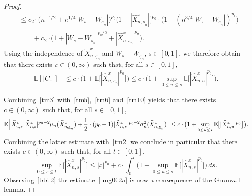 \documentclass[11pt]{amsart}
\newcommand{\EE}{{\mathbb E}}
\newcommand{\usn}{\underline {s}_n}
\theoremstyle{plain}
\theoremstyle{definition}
\begin{document}
\begin{proof}
\begin{equation}
\begin{aligned}
& \le c_2\cdot\bigl(n^{-1/2} + n^{1/4}|W_s-W_{\usn}|\bigr)^{p_0}\bigl(1+|\widehat X^x_{n,\usn}|\bigr)^{p_0} \cdot \bigl(1+(n^{3/4}|W_s-W_{\usn}|)^{p_0}
\bigr)\\
& \qquad + c_2 \cdot \bigl(1 + |W_s-W_{\usn}|^{p_0/2}+|\widehat X^x_{n,\usn}|^{p_0}\bigr).
\end{aligned}
\end{equation}
Using  the independence of $\widehat X^x_{n,\usn}$ and $W_s-W_{\usn}$, $s\in[0,1]$, we therefore obtain that there exists $c\in (0,\infty)$ such that, for all $s\in[0,1]$,
\begin{equation}\label{tm10}
\begin{aligned}
\EE[|C_s|] & \le c\cdot\bigl(1+ \EE\bigl[|\widehat X^x_{n,\usn}|^{p_0}\bigr]\bigr)\le c\cdot \bigl(1 + \sup_{0\le u\le s}\EE\bigl[|\widehat X^x_{n,u}|^{p_0}\bigr]\bigr).
\end{aligned}
\end{equation}


Combining~\eqref{tm3} with~\eqref{tm5},~\eqref{tm6} and~\eqref{tm10} yields that there exists $c\in (0,\infty)$ such that, for all $s\in[0,1]$,
\begin{equation}\label{tm11}
\EE\Bigl[\widehat X^x_{n,s}|\widehat X^x_{n,s}|^{p_0-2}\mu_n(\widehat X^x_{n,\usn}) + \frac{1}{2} \cdot (p_0-1) |\widehat X^x_{n,s}|^{p_0-2}\sigma_n^2(\widehat X^x_{n,\usn})\Bigr]\le c\cdot \bigl(1 + \sup_{0\le u\le s}\EE\bigl[|\widehat X^x_{n,u}|^{p_0}\bigr]\bigr).
\end{equation}
 Combining the latter estimate with~\eqref{tm2} we conclude in particular that there exists $c\in (0,\infty)$ such that, for all
 $t\in[0,1]$,
\begin{equation}\label{tm12}
\sup_{0\le s\le t}\EE\bigl[|\widehat X^x_{n,s}|^{p_0}\bigr] \le |x|^{p_0} + c\cdot \int_0^t \bigl(1 + \sup_{0\le u\le s}\EE\bigl[|\widehat X^x_{n,s}|^{p_0}\bigr]\bigr)\, ds.
\end{equation}
 Observing~\eqref{bbb2} the estimate~\eqref{tmg002a} is now a consequence of the Gronwall lemma.


\end{proof}
\end{document}
